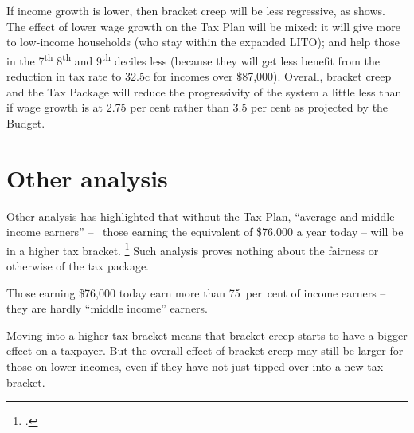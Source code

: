 \documentclass[submission]{grattan}\usepackage[]{graphicx}\usepackage[]{color}
\begin{document}
If income growth is lower, then bracket creep will be less regressive, as  shows. The effect of lower wage growth on the Tax Plan will be mixed: it will give more to low-income households (who stay within the expanded LITO); and help those in the 7\textsuperscript{th} 8\textsuperscript{th} and 9\textsuperscript{th} deciles less (because they will get less benefit from the reduction in tax rate to 32.5c for incomes over \$87,000). Overall, bracket creep and the Tax Package will reduce the progressivity of the system a little less than if wage growth is at 2.75 per cent rather than 3.5 per cent as projected by the Budget.

\section{Other analysis}\label{sec:other-analysis}

Other analysis has highlighted that without the Tax Plan, ``average and middle-income earners'' -- \ie~those earning the equivalent of \$76,000 a year today -- will be in a higher tax bracket.
  \footcite{Benson}
Such analysis proves nothing about the fairness or otherwise of the tax package.

Those earning \$76,000 today earn more than 75~per~cent of income earners -- they are hardly ``middle income'' earners.

Moving into a higher tax bracket means that bracket creep starts to have a bigger effect on a taxpayer. But the overall effect of bracket creep may still be larger for those on lower incomes, even if they have not just tipped over into a new tax bracket.
\end{document}
